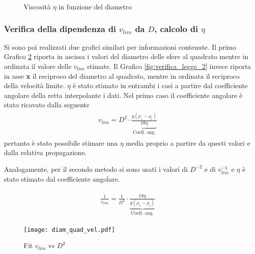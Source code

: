 \documentclass[a4paper,11pt,oneside]{article}
\begin{document}
\begin{figure}
    \centering
    \caption{Viscosità $\eta$ in funzione del diametro}
    \label{fig:eta}
\end{figure}



\subsubsection*{Verifica della dipendenza di $v_{lim}$ da $D$, calcolo di $\eta$}
Si sono poi realizzati due grafici similari per informazioni contenute. Il primo Grafico \ref{fig:verifica_legge_1} riporta in ascissa i valori del diametro delle sfere al quadrato mentre in ordinata il valore delle $v_{lim}$ stimate. Il Grafico \ref{fig:verifica_legge_2} invece riporta in asse \textbf{x} il reciproco del diametro al quadrato, mentre in ordinata il reciproco della velocità limite. $\eta$ è stato stimato in entrambi i casi a partire dal coefficiente angolare della retta interpolante i dati.\newline
Nel primo caso il coefficiente angolare è stato ricavato dalla seguente
\begin{align*}
\begin{split}
    v_{lim}=D^{2} \cdot \underbrace{\frac{g (\rho_s - \rho_l)}{18 \eta}}_\text{Coeff. ang.}
\end{split}
\end{align*}
pertanto è stato possibile stimare una $\eta$ media proprio a partire da questi valori e dalla relativa propagazione.

Analogamente, per il secondo metodo si sono usati i valori di $D^{-2}$ e di $v_{lim}^{-1}$ e $\eta$ è stato stimato dal coefficiente angolare.

\begin{align*}
\begin{split}
     \frac{1}{v_{lim}}= \frac{1}{D^{2}} \cdot \underbrace{\frac{18 \eta}{g (\rho_s - \rho_l)}}_\text{Coeff. ang.}
\end{split}
\end{align*}

\begin{figure}
    \centering
    \texttt{[image: diam\_quad\_vel.pdf]}
    \caption{Fit $v_{lim}$ vs $D^{2}$}
    \label{fig:verifica_legge_1}
\end{figure}
\end{document}
